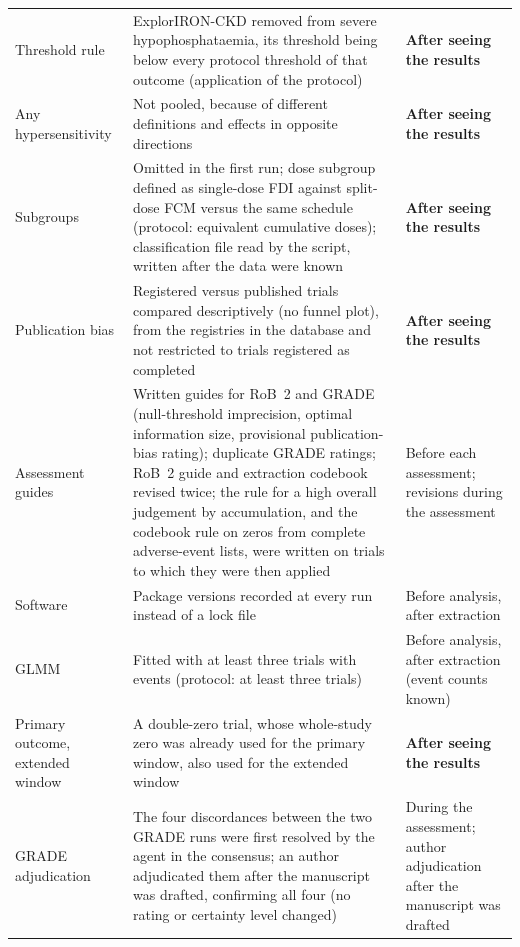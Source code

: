 \documentclass[11pt,a4paper]{article}
\begin{document}
\begin{table}[p]
\begin{tabularx}{\textwidth}{L{3.0cm}Y L{3.2cm}}
Threshold rule & ExplorIRON-CKD removed from severe hypophosphataemia, its threshold being below every protocol threshold of that outcome (application of the protocol) & \textbf{After seeing the results} \\
Any hypersensitivity & Not pooled, because of different definitions and effects in opposite directions & \textbf{After seeing the results} \\
Subgroups & Omitted in the first run; dose subgroup defined as single-dose FDI against split-dose FCM versus the same schedule (protocol: equivalent cumulative doses); classification file read by the script, written after the data were known & \textbf{After seeing the results} \\
Publication bias & Registered versus published trials compared descriptively (no funnel plot), from the registries in the database and not restricted to trials registered as completed & \textbf{After seeing the results} \\
Assessment guides & Written guides for RoB~2 and GRADE (null-threshold imprecision, optimal information size, provisional publication-bias rating); duplicate GRADE ratings; RoB~2 guide and extraction codebook revised twice; the rule for a high overall judgement by accumulation, and the codebook rule on zeros from complete adverse-event lists, were written on trials to which they were then applied & Before each assessment; revisions during the assessment \\
Software & Package versions recorded at every run instead of a lock file & Before analysis, after extraction \\
GLMM & Fitted with at least three trials with events (protocol: at least three trials) & Before analysis, after extraction (event counts known) \\
Primary outcome, extended window & A double-zero trial, whose whole-study zero was already used for the primary window, also used for the extended window & \textbf{After seeing the results} \\
GRADE adjudication & The four discordances between the two GRADE runs were first resolved by the agent in the consensus; an author adjudicated them after the manuscript was drafted, confirming all four (no rating or certainty level changed) & During the assessment; author adjudication after the manuscript was drafted \\
\bottomrule
\end{tabularx}
\end{table}
\end{document}
